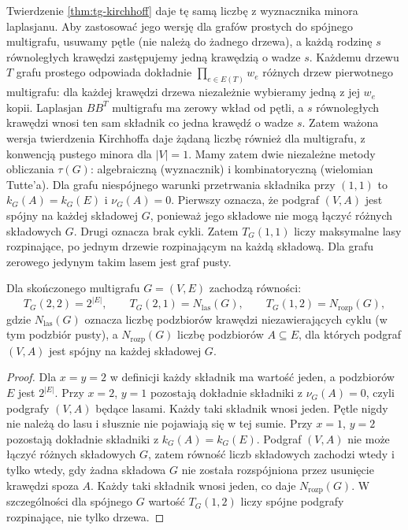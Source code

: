 \begin{uwaga}
Twierdzenie \ref{thm:tg-kirchhoff} daje tę samą liczbę
z wyznacznika minora laplasjanu. Aby zastosować jego
wersję dla grafów prostych do spójnego multigrafu,
usuwamy pętle (nie należą do żadnego drzewa),
a każdą rodzinę $s$ równoległych krawędzi zastępujemy
jedną krawędzią o wadze $s$. Każdemu drzewu $T$ grafu prostego odpowiada dokładnie
$\prod_{e\in E(T)}w_e$ różnych drzew pierwotnego
multigrafu: dla każdej krawędzi drzewa niezależnie
wybieramy jedną z jej $w_e$ kopii.
Laplasjan $BB^T$ multigrafu ma zerowy wkład od pętli,
a $s$ równoległych krawędzi wnosi ten sam składnik
co jedna krawędź o wadze $s$. Zatem ważona wersja
twierdzenia Kirchhoffa daje żądaną liczbę również
dla multigrafu, z konwencją pustego minora dla $|V|=1$.
Mamy zatem dwie niezależne metody
obliczania $\tau(G)$: algebraiczną (wyznacznik) i
kombinatoryczną (wielomian Tutte'a). Dla grafu niespójnego
warunki przetrwania składnika przy $(1,1)$ to
$k_G(A)=k_G(E)$ i $\nu_G(A)=0$. Pierwszy oznacza,
że podgraf $(V,A)$ jest spójny na każdej składowej
$G$, ponieważ jego składowe nie mogą łączyć różnych
składowych $G$. Drugi oznacza brak cykli.
Zatem $T_G(1,1)$ liczy maksymalne lasy rozpinające,
po jednym drzewie rozpinającym na każdą składową.
Dla grafu zerowego jedynym takim lasem jest graf pusty.
\end{uwaga}

\begin{stwierdzenie}
\label{prop:tg-tutte-specializations}
Dla skończonego multigrafu $G=(V,E)$ zachodzą równości:
\[
T_G(2,2)=2^{|E|},\qquad
T_G(2,1)=N_{\mathrm{las}}(G),\qquad
T_G(1,2)=N_{\mathrm{rozp}}(G),
\]
gdzie $N_{\mathrm{las}}(G)$ oznacza liczbę podzbiorów
krawędzi niezawierających cyklu (w tym podzbiór pusty),
a $N_{\mathrm{rozp}}(G)$ liczbę podzbiorów $A\subseteq E$,
dla których podgraf $(V,A)$ jest spójny na każdej
składowej $G$.
\end{stwierdzenie}

\begin{proof}
Dla $x=y=2$ w definicji każdy składnik ma wartość jeden,
a podzbiorów $E$ jest $2^{|E|}$. Przy $x=2$, $y=1$
pozostają dokładnie składniki z $\nu_G(A)=0$, czyli
podgrafy $(V,A)$ będące lasami. Każdy taki składnik
wnosi jeden. Pętle nigdy nie należą do lasu i słusznie
nie pojawiają się w tej sumie.
Przy $x=1$, $y=2$ pozostają dokładnie składniki
z $k_G(A)=k_G(E)$. Podgraf $(V,A)$ nie może łączyć
różnych składowych $G$, zatem równość liczb składowych
zachodzi wtedy i tylko wtedy, gdy żadna składowa $G$
nie została rozspójniona przez usunięcie krawędzi
spoza $A$. Każdy taki składnik wnosi jeden,
co daje $N_{\mathrm{rozp}}(G)$.
W szczególności dla spójnego $G$ wartość $T_G(1,2)$
liczy spójne podgrafy rozpinające, nie tylko drzewa.
\end{proof}

